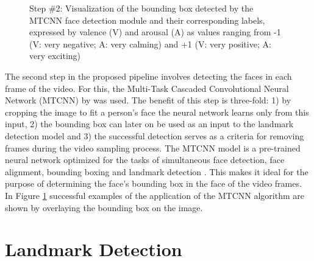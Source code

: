 \begin{figure}[H]
  \hfill
  \caption[ER pipeline step \#2: Face detection \& bounding box]{Step \#2: Visualization of the bounding box detected by the MTCNN face detection module \citep{Zhang:2016:MTCCN} and their corresponding labels, expressed by valence (V) and arousal (A) as values ranging from -1 (V: very negative; A: very calming) and +1 (V: very positive; A: very exciting)}
  \label{fig:MethodologyBoundingBox}
\end{figure}


The second step in the proposed pipeline involves detecting the faces in each frame of the video. For this, the Multi-Task Cascaded Convolutional Neural Network (MTCNN) by \citet{Zhang:2016:MTCCN} was used. The benefit of this step is three-fold: 1) by cropping the image to fit a person's face the neural network learns only from this input, 2) the bounding box can later on be used as an input to the landmark detection model and 3) the successful detection serves as a criteria for removing frames during the video sampling process.
\newline\newline
The MTCNN model is a pre-trained neural network optimized for the tasks of simultaneous face detection, face alignment, bounding boxing and landmark detection \citep{Brownlee:2019:VggFace2HowToFaceRec}. This makes it ideal for the purpose of determining the face's bounding box in the face of the video frames. In Figure \ref{fig:MethodologyBoundingBox} successful examples of the application of the MTCNN algorithm are shown by overlaying the bounding box on the image.


\section{Landmark Detection}

